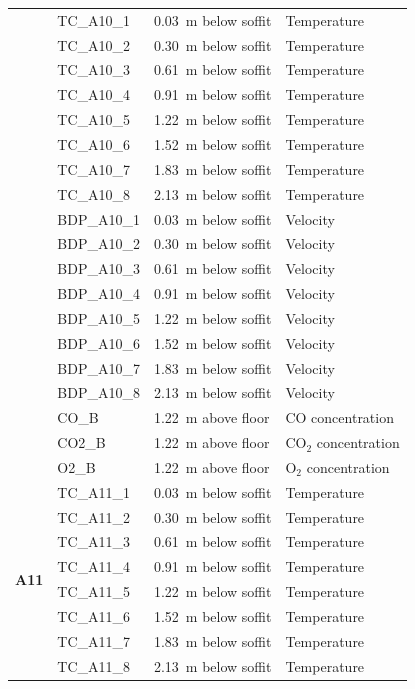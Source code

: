 \documentclass[12pt,oneside]{book}
\begin{document}
\begin{longtable}[c]{c|lll}
\newpage
\multirow{19}{*}{\large\textbf{A10}} 
 & TC\_A10\_1  & 0.03~m below soffit & Temperature \\
 & TC\_A10\_2  & 0.30~m below soffit & Temperature \\
 & TC\_A10\_3  & 0.61~m below soffit & Temperature \\
 & TC\_A10\_4  & 0.91~m below soffit & Temperature \\
 & TC\_A10\_5  & 1.22~m below soffit & Temperature \\
 & TC\_A10\_6  & 1.52~m below soffit & Temperature \\
 & TC\_A10\_7  & 1.83~m below soffit & Temperature \\
 & TC\_A10\_8  & 2.13~m below soffit & Temperature \\
\cline{2-4}
 & BDP\_A10\_1 & 0.03~m below soffit  & Velocity \\
 & BDP\_A10\_2 & 0.30~m below soffit  & Velocity \\
 & BDP\_A10\_3 & 0.61~m below soffit  & Velocity \\
 & BDP\_A10\_4 & 0.91~m below soffit  & Velocity \\
 & BDP\_A10\_5 & 1.22~m below soffit  & Velocity \\
 & BDP\_A10\_6 & 1.52~m below soffit  & Velocity \\
 & BDP\_A10\_7 & 1.83~m below soffit  & Velocity \\
 & BDP\_A10\_8 & 2.13~m below soffit  & Velocity \\
\cline{2-4}
 & CO\_B      & 1.22~m above floor   & CO concentration \\
 & CO2\_B     & 1.22~m above floor   & CO$_2$ concentration \\
 & O2\_B      & 1.22~m above floor   & O$_2$ concentration \\
\midrule
\multirow{16}{*}{\large{\textbf{A11}}}
 & TC\_A11\_1  & 0.03~m below soffit  & Temperature \\
 & TC\_A11\_2  & 0.30~m below soffit  & Temperature \\
 & TC\_A11\_3  & 0.61~m below soffit  & Temperature \\
 & TC\_A11\_4  & 0.91~m below soffit  & Temperature \\
 & TC\_A11\_5  & 1.22~m below soffit  & Temperature \\
 & TC\_A11\_6  & 1.52~m below soffit  & Temperature \\
 & TC\_A11\_7  & 1.83~m below soffit  & Temperature \\
 & TC\_A11\_8  & 2.13~m below soffit  & Temperature \\

\end{longtable}
\end{document}
